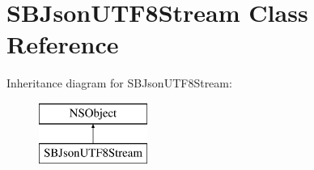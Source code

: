 \hypertarget{interface_s_b_json_u_t_f8_stream}{\section{S\-B\-Json\-U\-T\-F8\-Stream Class Reference}
\label{interface_s_b_json_u_t_f8_stream}
}
Inheritance diagram for S\-B\-Json\-U\-T\-F8\-Stream\-:\begin{figure}[H]
\begin{center}
\leavevmode
\includegraphics[height=2.000000cm]{interface_s_b_json_u_t_f8_stream}
\end{center}
\end{figure}
